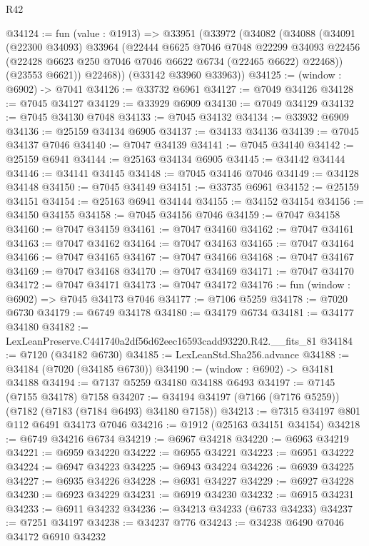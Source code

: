 \begin{lexlean}{R42}
\begin{coremodule}
{@34124 := fun (value : @1913) =>
  @33951
    (@33972
      (@34082
        (@34088
          (@34091
            (@22300 @34093)
            @33964
            (@22444
              @6625
              @7046
              @7048
              @22299
              @34093
              @22456
              (@22428 @6623 @250 @7046 @7046 @6622 @6734 (@22465 @6622) @22468))
            (@23553 @6621))
          @22468))
      (@33142 @33960 @33963))
@34125 := (window : @6902) -> @7041
@34126 := @33732 @6961
@34127 := @7049 @34126
@34128 := @7045 @34127
@34129 := @33929 @6909
@34130 := @7049 @34129
@34132 := @7045 @34130 @7048
@34133 := @7045 @34132
@34134 := @33932 @6909
@34136 := @25159 @34134 @6905
@34137 := @34133 @34136
@34139 := @7045 @34137 @7046
@34140 := @7047 @34139
@34141 := @7045 @34140
@34142 := @25159 @6941
@34144 := @25163 @34134 @6905
@34145 := @34142 @34144
@34146 := @34141 @34145
@34148 := @7045 @34146 @7046
@34149 := @34128 @34148
@34150 := @7045 @34149
@34151 := @33735 @6961
@34152 := @25159 @34151
@34154 := @25163 @6941 @34144
@34155 := @34152 @34154
@34156 := @34150 @34155
@34158 := @7045 @34156 @7046
@34159 := @7047 @34158
@34160 := @7047 @34159
@34161 := @7047 @34160
@34162 := @7047 @34161
@34163 := @7047 @34162
@34164 := @7047 @34163
@34165 := @7047 @34164
@34166 := @7047 @34165
@34167 := @7047 @34166
@34168 := @7047 @34167
@34169 := @7047 @34168
@34170 := @7047 @34169
@34171 := @7047 @34170
@34172 := @7047 @34171
@34173 := @7047 @34172
@34176 := fun (window : @6902) => @7045 @34173 @7046
@34177 := @7106 @5259
@34178 := @7020 @6730
@34179 := @6749 @34178
@34180 := @34179 @6734
@34181 := @34177 @34180
@34182 := LexLeanPreserve.C441740a2df56d62eec16593cadd93220.R42.__fits_81
@34184 := @7120 (@34182 @6730)
@34185 := LexLeanStd.Sha256.advance
@34188 := @34184 (@7020 (@34185 @6730))
@34190 := (window : @6902) -> @34181 @34188
@34194 := @7137 @5259 @34180 @34188 @6493
@34197 := @7145 (@7155 @34178) @7158
@34207 := @34194 @34197 (@7166 (@7176 @5259)) (@7182 (@7183 (@7184 @6493) @34180 @7158))
@34213 := @7315 @34197 @801 @112 @6491 @34173 @7046
@34216 := @1912 (@25163 @34151 @34154)
@34218 := @6749 @34216 @6734
@34219 := @6967 @34218
@34220 := @6963 @34219
@34221 := @6959 @34220
@34222 := @6955 @34221
@34223 := @6951 @34222
@34224 := @6947 @34223
@34225 := @6943 @34224
@34226 := @6939 @34225
@34227 := @6935 @34226
@34228 := @6931 @34227
@34229 := @6927 @34228
@34230 := @6923 @34229
@34231 := @6919 @34230
@34232 := @6915 @34231
@34233 := @6911 @34232
@34236 := @34213 @34233 (@6733 @34233)
@34237 := @7251 @34197
@34238 := @34237 @776
@34243 := @34238 @6490 @7046 @34172 @6910 @34232
}
\end{coremodule}
\end{lexlean}
